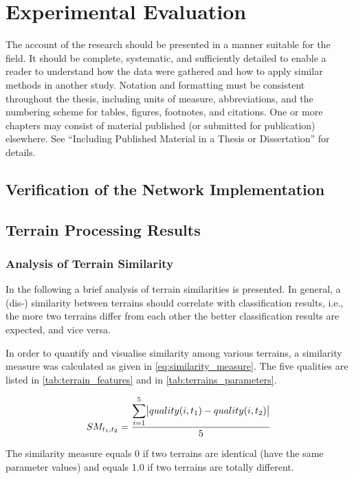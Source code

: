 \chapter{Experimental Evaluation} \label{chap:results}

The account of the research should be presented in a manner suitable for the field. It should be complete, systematic, and sufficiently detailed to enable a reader to understand how the data were gathered and how to apply similar methods in another study. Notation and formatting must be consistent throughout the thesis, including units of measure, abbreviations, and the numbering scheme for tables, figures, footnotes, and citations. One or more chapters may consist of material published (or submitted for publication) elsewhere. See “Including Published Material in a Thesis or Dissertation” for details.

\section{Verification of the Network Implementation}

\section{Terrain Processing Results}

\subsection{Analysis of Terrain Similarity} \label{ssec:terrains_analysis}
In the following a brief analysis of terrain similarities is presented. In general, a (dis-) similarity between terrains should correlate with classification results, i.e., the more two terrains differ from each other the better classification results are expected, and vice versa.

In order to quantify and visualise similarity among various terrains, a similarity measure was calculated as given in \cref{eq:similarity_measure}. The five qualities are listed in \cref{tab:terrain_features} and in \cref{tab:terrains_parameters}.

\begin{align} \label{eq:similarity_measure}
  SM_{t_1, t_2} = \frac{\displaystyle\sum_{i=1}^{5} \abs{quality(i, t_1) - quality(i, t_2)}}{5}
\end{align} 

The similarity measure equals 0 if two terrains are identical (have the same parameter values) and equals 1.0 if two terrains are totally different.

